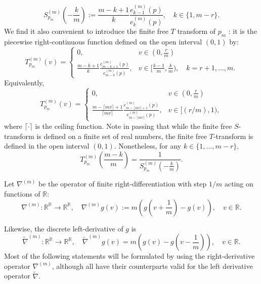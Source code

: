 \documentclass[12pt,reqno]{amsart}
\newcommand{\ceil}[1]{\lceil {#1} \rceil}
\begin{document}
$$
{S}_{p_m}^{(m)}\left(-\frac{k}{m}\right) := \frac{m-k+1}{k}\frac{e^{(m)}_{k-1}(p)}{e^{(m)}_k(p)},\quad k \in \{1,m-r\}.
$$
We find it also convenient to introduce the finite free $T$ transform of $p_m$ : it is the piecewise right-continuous function defined on the open interval $(0,1)$ by: 
$$
T_{p_m}^{(m)}(v) = \begin{cases}
                    0, & v \in (0,\frac{r}{m})\\
\displaystyle                    \frac{m-k+1}{k}\frac{e^{(m)}_{m-k+1}(p)}{e^{(m)}_{m-k}(p)}, & v \in [\frac{k-1}{m}, \frac{k}{m}), \quad k = r+1, \ldots, m.
                 \end{cases}
$$ 
Equivalently, 
\begin{equation}\label{Defi-T-Trans} 
T_{p_m}^{(m)}(v) = \begin{cases}
                    0, & v \in (0,\frac{r}{m})\\
\displaystyle                    \frac{m-\ceil{mv}+1}{\ceil{mv}}\frac{e^{(m)}_{m-\ceil{mv}+1}(p)}{e^{(m)}_{m-\ceil{mv}}(p)}, & v \in [(r/m),1),
                 \end{cases}
\end{equation}
where $\ceil{\cdot}$ is the ceiling function. 
Note in passing that while the finite free $S$-transform is defined on a finite set of real numbers, the finite free $T$-transform is defined in the open interval $(0,1)$.  Nonetheless, for any $k \in \{1, \dots, m-r\},$ 
\begin{equation}
\label{eqn:relation}
   T_{p_m}^{(m)}\left(\frac{m-k}{m}\right) = \frac{1}{\displaystyle {S}_{p_m}^{(m)}\left(-\frac{k}{m}\right)}.
\end{equation}

Let $\nabla^{(m)}$ be the operator of finite right-differentiation with step $1/m$ acting on functions of $\mathbb{R}$:
$$ 
	\nabla^{(m)}\colon \mathbb{R}^{\mathbb{R}}\to \mathbb{R}^{\mathbb{R}},\quad \nabla^{(m)} g (v) := m\left(g \left(v+\frac{1}{m}\right) - g (v)\right),\quad v \in \mathbb{R}
.$$

Likewise, the discrete left-derivative of $g$ is 
$$
\tilde{\nabla}^{(m)}\colon \mathbb{R}^{\mathbb{R}} \to \mathbb{R}^{\mathbb{R}}, \quad \tilde{\nabla}^{(m)}g(v) = m\left(g(v)-g\left(v-\frac{1}{m}\right)\right),\quad v \in \mathbb{R}.
$$
Most of the following statements will be formulated by using the right-derivative operator $\nabla^{(m)}$, although all have their counterparts valid for the left derivative operator $\tilde{\nabla}$.
\end{document}
